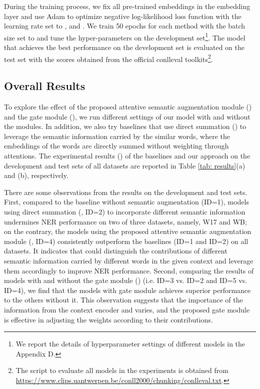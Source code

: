 \documentclass[11pt,a4paper]{article}
\begin{document}
During the training process, we fix all pre-trained embeddings in the embedding layer and use Adam \cite{DBLP:journals/corr/KingmaB14} to optimize negative log-likelihood loss function with the learning rate set to ,  and . 
We train 50 epochs for each method with the batch size set to  and tune the hyper-parameters on the development set\footnote{We report the details of hyperparameter settings of different models in the Appendix D.}.
The model that achieves the best performance on the development set is evaluated on the test set with the  scores obtained from the official conlleval toolkits\footnote{The script to evaluate all models in the experiments is obtained from \url{https://www.clips.uantwerpen.be/conll2000/chunking/conlleval.txt}.}.







\subsection{Overall Results}



To explore the effect of the proposed attentive semantic augmentation module () and the gate module (), we run different settings of our model with and without the modules.
In addition, we also try baselines that use direct summation () to leverage the semantic information carried by the similar words, where the embeddings of the words are directly summed without weighting through attentions.
The experimental results () of the baselines and our approach on the development and test sets of all datasets are reported in Table \ref{tab: results}(a) and (b), respectively.


There are some observations from the results on the development and test sets.
First, compared to the baseline without semantic augmentation (ID=1), models using direct summation (, ID=2) to incorporate different semantic information undermines NER performance on two of three datasets, namely, W17 and WB;
on the contrary, the models using the proposed attentive semantic augmentation module (, ID=4) consistently outperform the baselines (ID=1 and ID=2) on 
all datasets.
It indicates that  could distinguish the contributions of different semantic information carried by different words in the given context and leverage them accordingly to improve NER performance.
Second, comparing the results of models with and without the gate module () (i.e. ID=3 vs. ID=2 and ID=5 vs. ID=4), we find that the models with gate module achieves superior performance to the others without it.
This observation suggests that the importance of the information from the context encoder and  varies, and the proposed gate module is effective in adjusting the weights according to their contributions.
\end{document}
